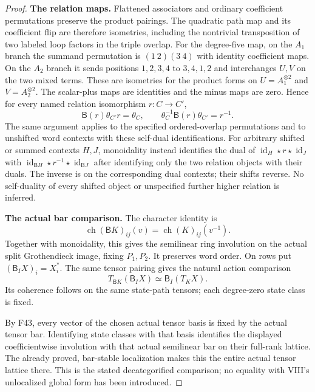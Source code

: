 \documentclass[11pt,a4paper]{article}
\newcommand{\fid}[1]{\textsf{#1}}\newcommand{\gate}[1]{\textsf{#1}}
\theoremstyle{named}\newtheorem{finding}{Finding}[section]
\theoremstyle{definition}\newtheorem{definition}[finding]{Definition}
\theoremstyle{remark}\newtheorem{remark}[finding]{Remark}
\begin{document}
\begin{proof}
\par\smallskip\noindent\textbf{The relation maps.}\quad
Flattened associators and ordinary coefficient permutations
preserve the product pairings. The quadratic path map and
its coefficient flip are therefore isometries, including
the nontrivial transposition of two labeled loop factors
in the triple overlap.
For the degree-five map, on the $A_1$ branch the summand
permutation is $(1\ 2)(3\ 4)$ with identity coefficient maps.
On the $A_2$ branch it sends positions $1,2,3,4$ to
$3,4,1,2$ and interchanges $U,V$ on the two mixed terms.
These are isometries for the product forms on
$U=A_1^{\otimes2}$ and $V=A_2^{\otimes2}$.
The scalar-plus maps are identities and the minus maps
are zero. Hence for every named relation isomorphism
$r:C\to C'$,
\[
 \mathsf B(r)\theta_{C'}r=\theta_C,
 \qquad
 \theta_C^{-1}\mathsf B(r)\theta_{C'}=r^{-1}.
\]
The same argument applies to the specified ordered-overlap
permutations and to unshifted word contexts with these
self-dual identifications. For arbitrary shifted or summed
contexts $H,J$, monoidality instead identifies the dual
of $\operatorname{id}_H\star r\star\operatorname{id}_J$
with $\operatorname{id}_{\mathsf B H}\star r^{-1}
\star\operatorname{id}_{\mathsf B J}$ after identifying only
the two relation objects with their duals. The inverse is
on the corresponding dual contexts; their shifts reverse.
No self-duality of every shifted object or unspecified
further higher relation is inferred.

\par\smallskip\noindent\textbf{The actual bar comparison.}\quad
The character identity is
\[
 \operatorname{ch}(\mathsf B K)_{ij}(v)
       =\operatorname{ch}(K)_{ij}(v^{-1}).
\]
Together with monoidality, this gives the semilinear
ring involution on the actual split Grothendieck image,
fixing $P_1,P_2$. It preserves word order.
On rows put $(\mathsf B_I X)_i=X_i^*$.
The same tensor pairing gives the natural action comparison
\[
 T_{\mathsf B K}(\mathsf B_I X)
        \simeq\mathsf B_I(T_K X).
\]
Its coherence follows on the same state-path tensors;
each degree-zero state class is fixed.

By \fid{F43}, every vector of the chosen actual tensor
basis is fixed by the actual tensor bar. Identifying
state classes with that basis identifies the displayed
coefficientwise involution with that actual semilinear
bar on their full-rank lattice. The already proved,
bar-stable localization makes this the entire actual
tensor lattice there. This is the stated decategorified
comparison; no equality with VIII's unlocalized global
form has been introduced.
\end{proof}
\end{document}
